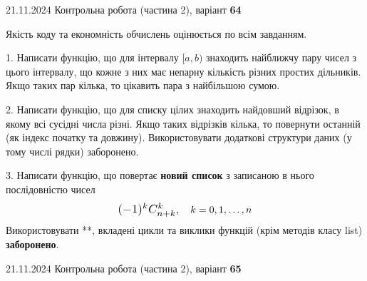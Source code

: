 \documentclass[12pt, ukrainian]{article}
\begin{document}
{{{{\begin {large}
\end{large}
\newpage
{{21.11.2024 Контрольна робота  (частина 2), варіант  \No \textbf { 64 }\par}}


{
\begin {large}
Якість коду та економність обчислень оцінюється по всім завданням.

\vspace{5mm}

1. Написати функцію, що для інтервалу $[a, b)$ знаходить найближчу пару чисел з цього інтервалу, що кожне з них має непарну кількість різних простих дільників. Якщо таких пар кілька, то цікавить пара з найбільшою сумою.

\vspace{10mm}


2. Написати функцію, що для списку цілих знаходить найдовший відрізок, в якому всі сусідні числа різні. Якщо таких відрізків кілька, то повернути останній (як індекс початку та довжину). Використовувати додаткові структури даних (у тому числі рядки) заборонено.

\vspace{10mm}


3. 
Написати функцію, що повертає \textbf{новий список} з записаною в нього послідовністю чисел
$$\scalebox{1.2}{$(-1)^{k}C_{n+k}^{k}$}, \quad k=0,1,\ldots,n$$
Використовувати **, вкладені цикли та виклики функцій (крім методів класу list) \textbf{заборонено}.

\end{large}
\vspace{25mm}


{{21.11.2024 Контрольна робота  (частина 2), варіант  \No \textbf { 65 }\par}}


}}}}}
\end{document}
